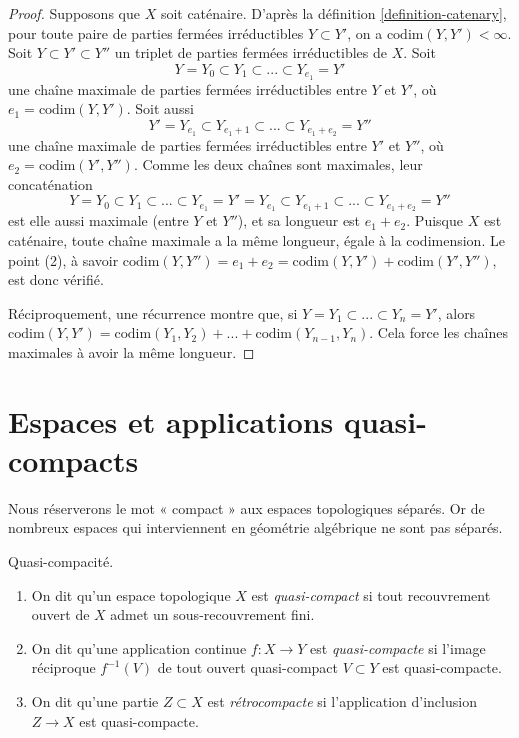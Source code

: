 \begin{proof}
Supposons que $X$ soit caténaire. D'après la définition
\ref{definition-catenary}, pour toute paire de parties fermées irréductibles
$Y \subset Y'$, on a $\text{codim}(Y,Y') < \infty$.
Soit $Y \subset Y' \subset Y''$ un triplet de parties fermées irréductibles de
$X$. Soit
$$
Y = Y_0 \subset Y_1 \subset ... \subset Y_{e_1} = Y'
$$
une chaîne maximale de parties fermées irréductibles entre $Y$ et $Y'$, où
$e_1 = \text{codim}(Y,Y')$. Soit aussi
$$
Y' = Y_{e_1} \subset Y_{e_1 + 1}\subset ... \subset Y_{e_1 + e_2} = Y''
$$
une chaîne maximale de parties fermées irréductibles entre $Y'$ et $Y''$, où
$e_2 = \text{codim}(Y',Y'')$.
Comme les deux chaînes sont maximales, leur concaténation
$$
Y = Y_0\subset Y_1 \subset ... \subset Y_{e_1} = Y' =
Y_{e_1} \subset Y_{e_1+1}\subset ... \subset Y_{e_1+e_2}=Y''
$$
est elle aussi maximale (entre $Y$ et $Y''$), et sa longueur est
$e_1 + e_2$. Puisque $X$ est caténaire, toute chaîne maximale a la même
longueur, égale à la codimension. Le point (2), à savoir
$\text{codim}(Y,Y'') = e_1 + e_2 = \text{codim}(Y,Y') + \text{codim}(Y',Y'')$,
est donc vérifié.

\medskip\noindent
Réciproquement, une récurrence montre que, si
$Y = Y_1 \subset ... \subset Y_n = Y'$, alors
$ \text{codim}(Y,Y') = \text{codim}(Y_1,Y_2) + ... +
\text{codim}(Y_{n-1},Y_n)$. Cela force les chaînes maximales à avoir la même
longueur.
\end{proof}








\section{Espaces et applications quasi-compacts}
\label{section-quasi-compact}

\noindent
Nous réserverons le mot « compact » aux espaces topologiques séparés. Or de
nombreux espaces qui interviennent en géométrie algébrique ne sont pas séparés.

\begin{definition}
\label{definition-quasi-compact}
Quasi-compacité.
\begin{enumerate}
\item On dit qu'un espace topologique $X$ est {\it quasi-compact} si tout
recouvrement ouvert de $X$ admet un sous-recouvrement fini.
\item On dit qu'une application continue $f : X \to Y$ est
{\it quasi-compacte} si l'image réciproque $f^{-1}(V)$ de tout ouvert
quasi-compact $V \subset Y$ est quasi-compacte.
\item On dit qu'une partie $Z \subset X$ est {\it rétrocompacte} si
l'application d'inclusion $Z \to X$ est quasi-compacte.
\end{enumerate}
\end{definition}

